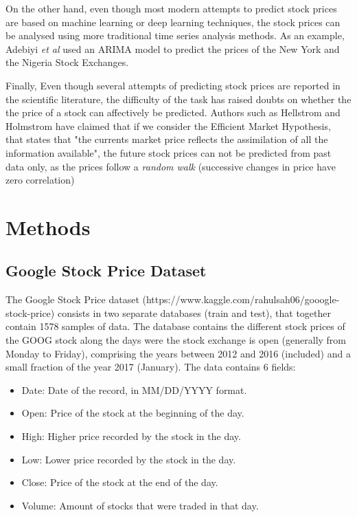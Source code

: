 \documentclass[10pt,twocolumn,letterpaper]{article}
\begin{document}
On the other hand, even though most modern attempts to predict stock prices are based on machine learning or deep learning techniques, the stock prices can be analysed using more traditional time series analysis methods. As an example, Adebiyi \textit{et al} \cite{Adebiyi2014} used an ARIMA model to predict the prices of the New York and the Nigeria Stock Exchanges.

Finally, Even though several attempts of predicting stock prices are reported in the scientific literature, the difficulty of the task has raised doubts on whether the the price of a stock can affectively be predicted. Authors such as Hellstrom and Holmstrom \cite{Hellstrom1998} have claimed that if we consider the Efficient Market Hypothesis, that states that "the currents market price reflects the assimilation of all the information available", the future stock prices can not be predicted from past data only, as the prices follow a \textit{random walk} (successive changes in price have zero correlation)


\section{Methods}

\subsection{Google Stock Price Dataset}

The Google Stock Price dataset (https://www.kaggle.com/rahulsah06/gooogle-stock-price) consists in two separate databases (train and test), that together contain 1578 samples of data. The database contains the different stock prices of the GOOG stock along the days were the stock exchange is open (generally from Monday to Friday), comprising the years between 2012 and 2016 (included) and a small fraction of the year 2017 (January). The data contains 6 fields:

\begin{itemize}
	\item Date: Date of the record, in MM/DD/YYYY format.
	\item Open: Price of the stock at the beginning of the day.
	\item High: Higher price recorded by the stock in the day.
	\item Low: Lower price recorded by the stock in the day.
	\item Close: Price of the stock at the end of the day.
	\item Volume: Amount of stocks that were traded in that day.
\end{itemize}
\end{document}
